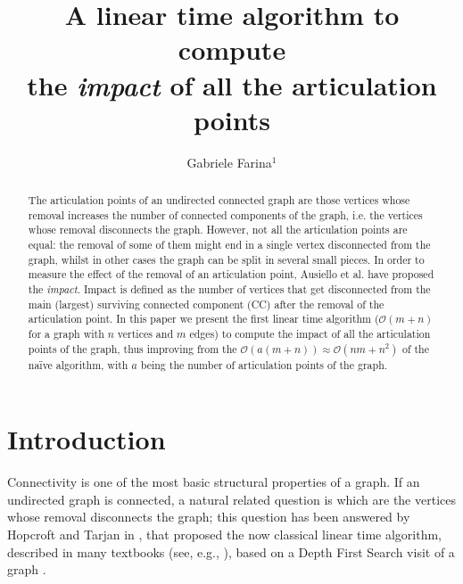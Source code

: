 \documentclass{llncs}
\newcommand{\bigoh}{\mathcal{O}}
\begin{document}
\title{A linear time algorithm to compute\\ the \emph{impact} of all the articulation points}
\author{Gabriele Farina$^1$}
\institute{}
\maketitle
\thispagestyle{empty}

\vspace{-.3cm}

\begin{abstract}
\noindent The articulation points of an undirected connected graph are those vertices whose removal increases the number of connected components of the graph, i.e. the vertices whose removal disconnects the graph. However, not all the articulation points are equal: the removal of some of them might end in a single vertex disconnected from the graph, whilst in other cases the graph can be split in several small pieces. In order to measure the effect of the removal of an articulation point, Ausiello et al. \cite{AFL12} have proposed the \emph{impact}. Impact is defined as the number of vertices that get disconnected from the main (largest) surviving connected component (CC) after the removal of the articulation point. 
In this paper we present the first linear time algorithm ($\bigoh(m+n)$ for a graph with $n$ vertices and $m$ edges) to compute the impact of all the articulation points of the graph, thus improving from the $\bigoh(a(m+n))\approx\bigoh(nm+n^2)$ of the na\"ive algorithm, with $a$ being the number of articulation points of the graph. 

\end{abstract}

\vspace{-.8cm}









\section{Introduction}

Connectivity is one of the most basic structural properties of a graph. If an undirected graph is connected, a natural related question is which are the vertices whose removal disconnects the graph; this question has been answered by Hopcroft and Tarjan in \cite{HT73}, that proposed the now classical linear time algorithm, described in many textbooks (see, e.g., \cite{CLRS09}), based on a Depth First Search visit of a graph \cite{Tar72}.
\end{document}

